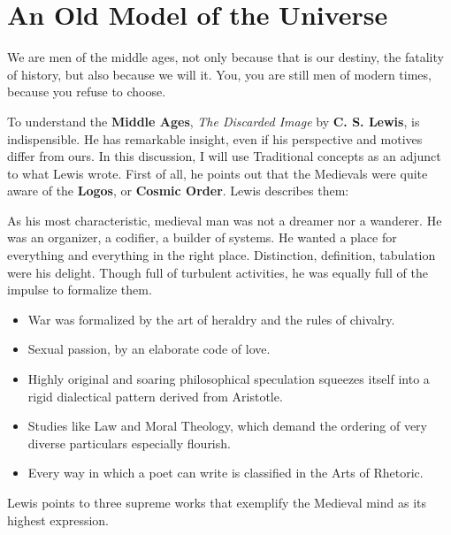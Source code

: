 \section{An Old Model of the Universe}

\begin{quotex}
We are men of the middle ages, not only because that is our destiny, the fatality of history, but also because we will it. You, you are still men of modern times, because you refuse to choose.
\end{quotex}


To understand the \textbf{Middle Ages}, \textit{The Discarded Image} by \textbf{C. S. Lewis}, is indispensible. He has remarkable insight, even if his perspective and motives differ from ours. In this discussion, I will use Traditional concepts as an adjunct to what Lewis wrote. First of all, he points out that the Medievals were quite aware of the \textbf{Logos}, or \textbf{Cosmic Order}. Lewis describes them:


\begin{quotex}
As his most characteristic, medieval man was not a dreamer nor a wanderer. He was an organizer, a codifier, a builder of systems. He wanted a place for everything and everything in the right place. Distinction, definition, tabulation were his delight. Though full of turbulent activities, he was equally full of the impulse to formalize them.

\begin{itemize}


\item War was formalized by the art of heraldry and the rules of chivalry.

\item Sexual passion, by an elaborate code of love.

\item Highly original and soaring philosophical speculation squeezes itself into a rigid dialectical pattern derived from Aristotle.

\item Studies like Law and Moral Theology, which demand the ordering of very diverse particulars especially flourish.

\item Every way in which a poet can write is classified in the Arts of Rhetoric.
\end{itemize}
\end{quotex}


Lewis points to three supreme works that exemplify the Medieval mind as its highest expression.

